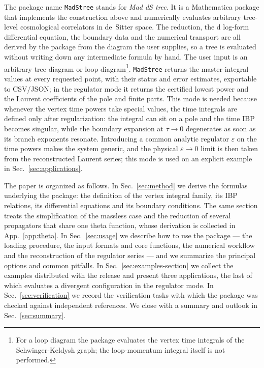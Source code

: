 \documentclass[11pt,a4paper]{article}
\begin{document}
The package name \texttt{MadStree} stands for \emph{Mad dS tree}. It is a Mathematica package
that implements the construction above and numerically evaluates arbitrary tree-level
cosmological correlators in de~Sitter space. The
reduction, the d log-form differential equation, the boundary data and the numerical transport are all
derived by the package from the diagram the user supplies, so a tree is evaluated without writing down
any intermediate formula by hand. The user input is an arbitrary tree diagram or loop diagram\footnote{For a loop
diagram the package evaluates the vertex time integrals of the Schwinger-Keldysh graph; the loop-momentum
integral itself is not performed.}. \texttt{MadStree}
returns the master-integral values at every requested point, with their status and error
estimates, exportable to CSV/JSON; in the regulator mode it returns the certified lowest power
and the Laurent coefficients of the pole and finite parts. This mode is needed because whenever the vertex time powers take special values, the time integrals are defined only after regularization: the integral can sit on a
pole and the time IBP becomes singular, while the boundary expansion at $\tau\to0$ degenerates
as soon as its branch exponents resonate. Introducing a common analytic regulator $\varepsilon$
on the time powers makes the system generic, and the physical $\varepsilon\to0$ limit is then
taken from the reconstructed Laurent series; this mode is used on an explicit example in
Sec.~\ref{sec:applications}.

The paper is organized as follows. In Sec.~\ref{sec:method} we derive the formulas underlying the package: the definition of the vertex integral family, its IBP relations, its differential equations and its boundary conditions. The same section treats the simplification of the massless case and the reduction of several propagators that share one theta function, whose derivation is collected in App.~\ref{app:theta}. In Sec.~\ref{sec:usage} we describe how to use the package --- the loading procedure, the input formats and core functions, the numerical workflow and the reconstruction of the regulator series --- and we summarize the principal options and common pitfalls. In Sec.~\ref{sec:examples-section} we collect the examples distributed with the release and present three applications, the last of which evaluates a divergent configuration in the regulator mode. In Sec.~\ref{sec:verification} we record the verification tasks with which the package was checked against independent references. We close with a summary and outlook in Sec.~\ref{sec:summary}.
\end{document}
